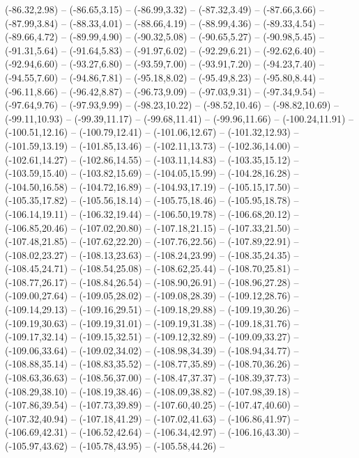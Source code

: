 {  (-86.32,2.98) -- (-86.65,3.15) -- (-86.99,3.32) -- (-87.32,3.49) -- (-87.66,3.66) -- (-87.99,3.84) -- (-88.33,4.01) --
  (-88.66,4.19) -- (-88.99,4.36) -- (-89.33,4.54) -- (-89.66,4.72) -- (-89.99,4.90) -- (-90.32,5.08) -- (-90.65,5.27) --
  (-90.98,5.45) -- (-91.31,5.64) -- (-91.64,5.83) -- (-91.97,6.02) -- (-92.29,6.21) -- (-92.62,6.40) -- (-92.94,6.60) --
  (-93.27,6.80) -- (-93.59,7.00) -- (-93.91,7.20) -- (-94.23,7.40) -- (-94.55,7.60) -- (-94.86,7.81) -- (-95.18,8.02) --
  (-95.49,8.23) -- (-95.80,8.44) -- (-96.11,8.66) -- (-96.42,8.87) -- (-96.73,9.09) -- (-97.03,9.31) -- (-97.34,9.54) --
  (-97.64,9.76) -- (-97.93,9.99) -- (-98.23,10.22) -- (-98.52,10.46) -- (-98.82,10.69) -- (-99.11,10.93) -- (-99.39,11.17) --
  (-99.68,11.41) -- (-99.96,11.66) -- (-100.24,11.91) -- (-100.51,12.16) -- (-100.79,12.41) -- (-101.06,12.67) -- (-101.32,12.93) --
  (-101.59,13.19) -- (-101.85,13.46) -- (-102.11,13.73) -- (-102.36,14.00) -- (-102.61,14.27) -- (-102.86,14.55) -- (-103.11,14.83) --
  (-103.35,15.12) -- (-103.59,15.40) -- (-103.82,15.69) -- (-104.05,15.99) -- (-104.28,16.28) -- (-104.50,16.58) -- (-104.72,16.89) --
  (-104.93,17.19) -- (-105.15,17.50) -- (-105.35,17.82) -- (-105.56,18.14) -- (-105.75,18.46) -- (-105.95,18.78) -- (-106.14,19.11) --
  (-106.32,19.44) -- (-106.50,19.78) -- (-106.68,20.12) -- (-106.85,20.46) -- (-107.02,20.80) -- (-107.18,21.15) -- (-107.33,21.50) --
  (-107.48,21.85) -- (-107.62,22.20) -- (-107.76,22.56) -- (-107.89,22.91) -- (-108.02,23.27) -- (-108.13,23.63) -- (-108.24,23.99) --
  (-108.35,24.35) -- (-108.45,24.71) -- (-108.54,25.08) -- (-108.62,25.44) -- (-108.70,25.81) -- (-108.77,26.17) -- (-108.84,26.54) --
  (-108.90,26.91) -- (-108.96,27.28) -- (-109.00,27.64) -- (-109.05,28.02) -- (-109.08,28.39) -- (-109.12,28.76) -- (-109.14,29.13) --
  (-109.16,29.51) -- (-109.18,29.88) -- (-109.19,30.26) -- (-109.19,30.63) -- (-109.19,31.01) -- (-109.19,31.38) -- (-109.18,31.76) --
  (-109.17,32.14) -- (-109.15,32.51) -- (-109.12,32.89) -- (-109.09,33.27) -- (-109.06,33.64) -- (-109.02,34.02) -- (-108.98,34.39) --
  (-108.94,34.77) -- (-108.88,35.14) -- (-108.83,35.52) -- (-108.77,35.89) -- (-108.70,36.26) -- (-108.63,36.63) -- (-108.56,37.00) --
  (-108.47,37.37) -- (-108.39,37.73) -- (-108.29,38.10) -- (-108.19,38.46) -- (-108.09,38.82) -- (-107.98,39.18) -- (-107.86,39.54) --
  (-107.73,39.89) -- (-107.60,40.25) -- (-107.47,40.60) -- (-107.32,40.94) -- (-107.18,41.29) -- (-107.02,41.63) -- (-106.86,41.97) --
  (-106.69,42.31) -- (-106.52,42.64) -- (-106.34,42.97) -- (-106.16,43.30) -- (-105.97,43.62) -- (-105.78,43.95) -- (-105.58,44.26) --
}
